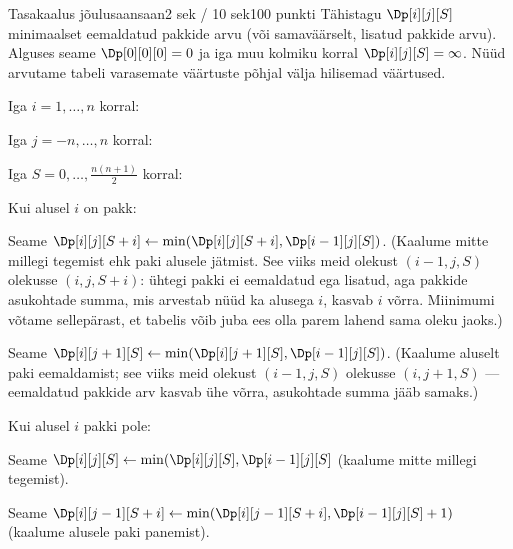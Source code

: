 \begin{yl}{6}{Tasakaalus jõulusaan}{saan}{2 sek / 10 sek}{100 punkti}
  Tähistagu $\Dp[i][j][S]$ minimaalset eemaldatud pakkide arvu (või samaväärselt,
  lisatud pakkide arvu). Alguses seame $\Dp[0][0][0] = 0$ ja iga muu kolmiku korral
  $\Dp[i][j][S] = \infty$. Nüüd arvutame tabeli varasemate väärtuste põhjal välja
  hilisemad väärtused.
  \begin{xitem}
  \item Iga $i = 1, \ldots, n$ korral:
    \begin{xitem}
    \item Iga $j = -n, \ldots, n$ korral:
      \begin{xitem}
      \item Iga $S = 0, \ldots, \frac{n (n + 1)}{2}$ korral:
        \begin{xitem}
        \item Kui alusel $i$ on pakk:
          \begin{xitem}
          \item Seame $\Dp[i][j][S + i] \gets \min(\Dp[i][j][S + i], \Dp[i - 1][j][S])$.
            (Kaalume mitte millegi tegemist ehk paki alusele jätmist. See viiks meid
            olekust $(i - 1, j, S)$ olekusse $(i, j, S + i)$: ühtegi pakki ei eemaldatud ega
            lisatud, aga pakkide asukohtade summa, mis arvestab nüüd ka alusega $i$, kasvab $i$
            võrra. Miinimumi võtame sellepärast, et tabelis võib juba ees olla parem
            lahend sama oleku jaoks.)
          \item Seame $\Dp[i][j + 1][S] \gets \min(\Dp[i][j + 1][S], \Dp[i - 1][j][S])$.
            (Kaalume aluselt paki eemaldamist; see viiks meid olekust $(i - 1, j, S)$ olekusse
            $(i, j + 1, S)$ --- eemaldatud pakkide arv kasvab ühe võrra, asukohtade summa jääb
            samaks.)
          \end{xitem}
        \item Kui alusel $i$ pakki pole:
          \begin{xitem}
          \item Seame $\Dp[i][j][S] \gets \min(\Dp[i][j][S], \Dp[i - 1][j][S]$ (kaalume mitte
            millegi tegemist).
          \item Seame $\Dp[i][j - 1][S + i] \gets \min(\Dp[i][j - 1][S + i], \Dp[i - 1][j][S] + 1)$
            (kaalume alusele paki panemist).
          \end{xitem}
        \end{xitem}
      \end{xitem}
    \end{xitem}
  \end{xitem}


\end{yl}
